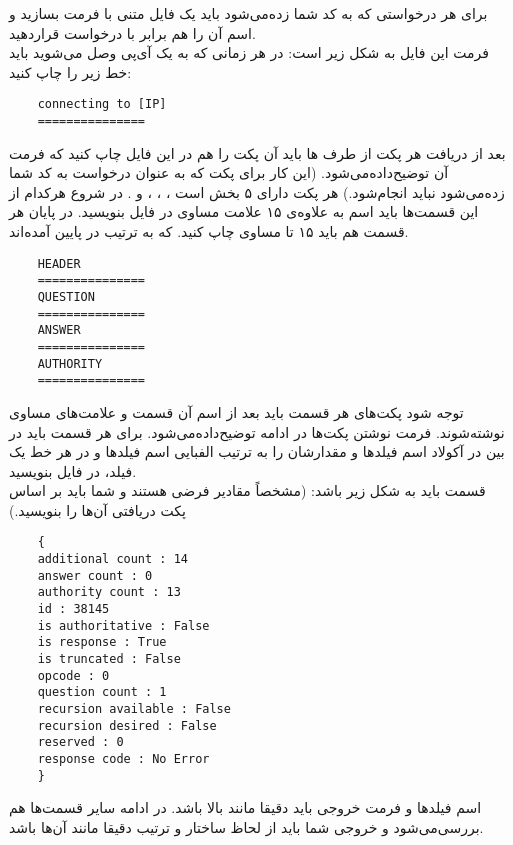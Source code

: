 \documentclass{article}
\begin{document}
    برای هر درخواستی که به کد شما زده‌می‌شود باید یک فایل متنی با فرمت 
    بسازید و اسم آن را هم برابر با 
    درخواست قرار‌دهید.
    \\
    فرمت این فایل به شکل زیر است:
    در هر زمانی که به یک آی‌پی وصل می‌شوید باید خط زیر را چاپ کنید:
    \\
    \begin{LTR}
    \begin{verbatim}
    connecting to [IP]
    ===============
    \end{verbatim}
    \end{LTR}	
    بعد از دریافت هر پکت از طرف
    ها
    باید آن پکت را هم در این فایل چاپ کنید که فرمت آن توضیح‌داده‌می‌شود.
    (این کار برای پکت که به عنوان درخواست به کد شما زده‌می‌شود نباید انجام‌شود.)
    هر پکت دارای ۵ بخش است
    ، 
    ، 
    ، 
    و 
    .
    در شروع هرکدام از این قسمت‌ها باید اسم به علاوه‌ی ۱۵ علامت مساوی در فایل بنویسید.
    در پایان هر قسمت هم باید ۱۵ تا مساوی چاپ کنید.
    که به ترتیب در پایین آمده‌اند.
    \begin{LTR}
    \begin{verbatim}
    HEADER
    ===============
    QUESTION
    ===============
    ANSWER
    ===============
    AUTHORITY
    ===============
    \end{verbatim}
    \end{LTR}	
    توجه شود پکت‌های هر قسمت باید بعد از اسم آن قسمت و علامت‌های مساوی نوشته‌شوند.
    فرمت نوشتن پکت‌ها در ادامه توضیح‌داده‌می‌شود.
    برای هر قسمت باید در بین در آکولاد اسم فیلد‌ها و مقدارشان را به ترتیب الفبایی اسم فیلد‌ها و در هر خط یک فیلد، در فایل بنویسید.
    \\
    قسمت
    باید به شکل زیر باشد:
    (مشخصاً مقادیر فرضی هستند و شما باید بر اساس پکت دریافتی آن‌ها را بنویسید.)
    \begin{LTR}
    \begin{verbatim}
    {
    additional count : 14
    answer count : 0
    authority count : 13
    id : 38145
    is authoritative : False
    is response : True
    is truncated : False
    opcode : 0
    question count : 1
    recursion available : False
    recursion desired : False
    reserved : 0
    response code : No Error
    }
    \end{verbatim}
    \end{LTR}	
    اسم فیلد‌ها و فرمت خروجی باید دقیقا مانند بالا باشد. در ادامه سایر قسمت‌ها هم بررسی‌می‌شود و خروجی شما باید از لحاظ ساختار و ترتیب دقیقا مانند آن‌ها باشد.
\end{document}
